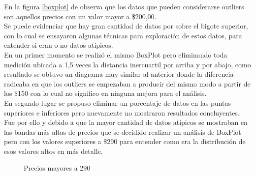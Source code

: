 En la figura \ref{boxplot} de observa que los datos que pueden considerarse outliers son aquellos precios con un valor mayor a \$200,00. \\
Se puede evidenciar que hay gran cantidad de datos por sobre el bigote superior, con lo cual se ensayaron algunas técnicas para exploración de estos datos, para entender si eran o no datos atípicos.\\
En un primer momento se realizó el mismo BoxPlot pero eliminando toda medición ubicada a 1,5 veces la distancia inercuartil por arriba y por abajo, como resultado se obtuvo un diagrama muy similar al anterior donde la diferencia radicaba en que los outliers se empezaban a producir del mismo modo a partir de los \$150 con lo cual no significo en ninguna mejora para el análisis.\\
En segundo lugar se propuso eliminar un porcentaje de datos en las puntas superiores e inferiores pero nuevamente no mostraron resultados concluyentes.\\
Fue por ello y debido a que la mayor cantidad de datos atípicos se mostraban en las bandas más altas de precios que se decidido realizar un análisis de BoxPlot pero con los valores superiores a \$290 para entender como era la distribución de esos valores altos en más detalle.


\begin{figure}[h]
\centering
{}%
\caption{Precios mayores a 290}
\label{boxplot_mayor290}
\end{figure}


